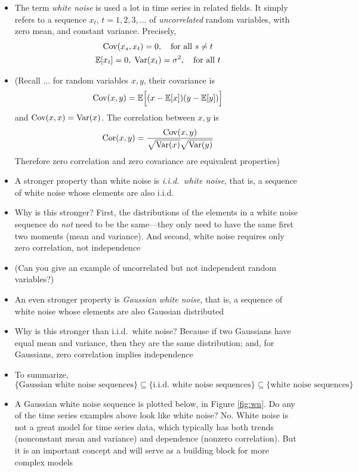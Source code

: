 \documentclass{article}
\begin{document}
\begin{itemize}
\item The term \emph{white noise} is used a lot in time series in related
  fields. It simply refers to a sequence $x_t$, $t = 1,2,3,\dots$ of
  \emph{uncorrelated} random variables, with zero mean, and constant
  variance. Precisely, 
  \begin{gather*}
  \operatorname{Cov}(x_s, x_t) = 0, \quad \text{for all $s \not= t$} \\
  \mathbb{E}[x_t] = 0, \; \operatorname{Var}(x_t) = \sigma^2, \quad \text{for all $t$} 
  \end{gather*}

\item (Recall ... for random variables $x,y$, their covariance is 
  \[
  \operatorname{Cov}(x, y) = \mathbb{E}\Big[ (x- \mathbb{E}[x]) (y - \mathbb{E}[y]) \Big]
  \]
  and $\operatorname{Cov}(x, x) = \operatorname{Var}(x)$. The correlation between $x,y$ is
  \[
  \operatorname{Cor}(x, y) = \frac{\operatorname{Cov}(x, y)}{\sqrt{\operatorname{Var}(x)} \sqrt{\operatorname{Var}(y)}}
  \]
  Therefore zero correlation and zero covariance are equivalent properties)

\item A stronger property than white noise is \emph{i.i.d.\ white noise}, that
  is, a sequence of white noise whose elements are also i.i.d.

\item Why is this stronger? First, the distributions of the elements in a white
  noise sequence do \emph{not} need to be the same---they only need to have the
  same first two moments (mean and variance). And second, white noise requires
  only zero correlation, not independence

\item (Can you give an example of uncorrelated but not independent random
  variables?) 

\item An even stronger property is \emph{Gaussian white noise}, that is, a
  sequence of white noise whose elements are also Gaussian distributed

\item Why is this stronger than i.i.d.\ white noise? Because if two Gaussians
  have equal mean and variance, then they are the same distribution; and, for
  Gaussians, zero correlation implies independence

\item To summarize, 
  \[
  \{ \text{Gaussian white noise sequences} \} \subseteq
  \{ \text{i.i.d.\ white noise sequences} \} \subseteq
  \{ \text{white noise sequences} \} 
  \]

\item A Gaussian white noise sequence is plotted below, in Figure
  \ref{fig:wn}. Do any of the time series examples above look like white noise?
  No. White noise is not a great model for time series data, which typically has
  both trends (nonconstant mean and variance) and dependence (nonzero
  correlation). But it is an important concept and will serve as a building
  block for more complex models  
\end{itemize}
\end{document}
